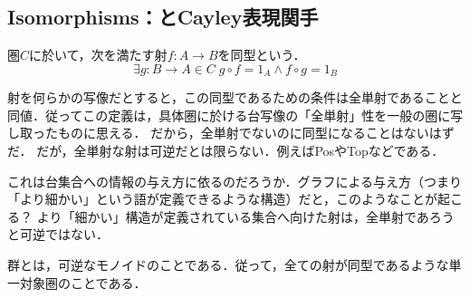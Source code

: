 \documentclass[uplatex, dvipdfmx]{jsarticle}
\begin{document}
\subsection{Isomorphisms：とCayley表現関手}

\begin{definition}[同型]
    圏$C$に於いて，次を満たす射$f:A\to B$を同型という．
    \[ \exists g:B\to A\in C\; g\circ f=1_A \land f\circ g=1_B \]
\end{definition}
\begin{remark*}
    射を何らかの写像だとすると，この同型であるための条件は全単射であることと同値．従ってこの定義は，具体圏に於ける台写像の「全単射」性を一般の圏に写し取ったものに思える．
    だから，全単射でないのに同型になることはないはずだ．
    だが，全単射な射は可逆だとは限らない．例えばPosやTopなどである．

    これは台集合への情報の与え方に依るのだろうか．グラフによる与え方（つまり「より細かい」という語が定義できるような構造）だと，このようなことが起こる？
    より「細かい」構造が定義されている集合へ向けた射は，全単射であろうと可逆ではない．
\end{remark*}

\begin{definition}[群]
    群とは，可逆なモノイドのことである．従って，全ての射が同型であるような単一対象圏のことである．
\end{definition}
\end{document}
